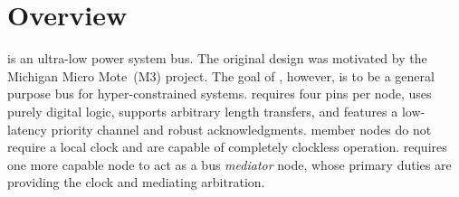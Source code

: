 \section*{Overview}
\bus is an ultra-low power system bus. The original design was motivated by
the Michigan Micro Mote~(M3) project. The goal of \bus, however, is to be a
general purpose bus for hyper-constrained systems. \bus requires four pins per
node, uses purely digital logic, supports arbitrary length transfers, and
features a low-latency priority channel and robust acknowledgments. \bus
member nodes do not require a local clock and are capable of completely
clockless operation. \bus requires one more capable node to act as a bus {\em
mediator} node, whose primary duties are providing the \bus clock and
mediating arbitration.
